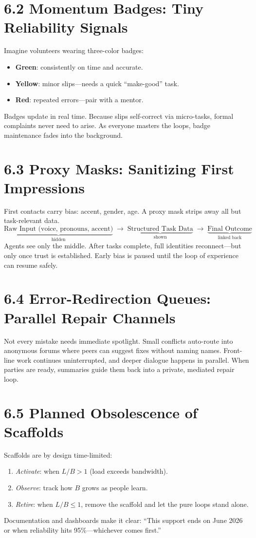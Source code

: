 \documentclass{book}       %
\begin{document}
\section*{6.2  Momentum Badges: Tiny Reliability Signals}
Imagine volunteers wearing three-color badges:
\begin{itemize}[noitemsep]
  \item \textbf{Green}: consistently on time and accurate.  
  \item \textbf{Yellow}: minor slips—needs a quick “make-good” task.  
  \item \textbf{Red}: repeated errors—pair with a mentor.  
\end{itemize}
Badges update in real time. Because slips self-correct via micro-tasks, formal complaints never need to arise.  As everyone masters the loops, badge maintenance fades into the background.

\section*{6.3  Proxy Masks: Sanitizing First Impressions}
First contacts carry bias: accent, gender, age.  A proxy mask strips away all but task-relevant data.  
\[
\underbrace{\text{Raw Input (voice, pronouns, accent)}}_{\text{hidden}}
\;\longrightarrow\;
\underbrace{\text{Structured Task Data}}_{\text{shown}}
\;\longrightarrow\;
\underbrace{\text{Final Outcome}}_{\text{linked back}}
\]
Agents see only the middle.  After tasks complete, full identities reconnect—but only once trust is established.  Early bias is paused until the loop of experience can resume safely.

\section*{6.4  Error-Redirection Queues: Parallel Repair Channels}
Not every mistake needs immediate spotlight.  Small conflicts auto-route into anonymous forums where peers can suggest fixes without naming names.  Front-line work continues uninterrupted, and deeper dialogue happens in parallel.  When parties are ready, summaries guide them back into a private, mediated repair loop.

\section*{6.5  Planned Obsolescence of Scaffolds}
Scaffolds are by design time-limited:
\begin{enumerate}[noitemsep]
  \item \emph{Activate}: when $L/B>1$ (load exceeds bandwidth).  
  \item \emph{Observe}: track how $B$ grows as people learn.  
  \item \emph{Retire}: when $L/B\le1$, remove the scaffold and let the pure loops stand alone.  
\end{enumerate}
Documentation and dashboards make it clear: “This support ends on June 2026 or when reliability hits 95\%—whichever comes first.”
\end{document}
